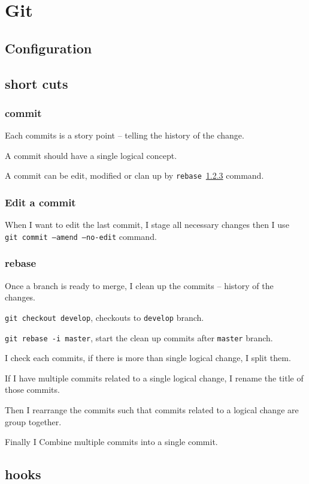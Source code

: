 \chapter{Git}

\section{Configuration}

\section{short cuts}

\subsection{commit}
Each commits is a story point -- telling the history of the change.

A commit should have a single logical concept.

A commit can be edit, modified or clan up by \texttt{rebase}~\ref{git_rebase} command.

\subsection{Edit a commit}
When I want to edit the last commit, I stage all necessary changes then I use \texttt{ git commit --amend --no-edit} command.


\subsection{rebase} \label{git_rebase}
Once a branch is ready to merge, I clean up the commits -- history of the changes. 


\texttt{git checkout develop}, checkouts to \texttt{develop} branch.

\texttt{git rebase -i master}, start the clean up commits after \texttt{master} branch.

I check each commits, if there is more than single logical change, I split them.

If I have multiple commits related to a single logical change, I rename the title of those commits.

Then I rearrange the commits such that commits related to a logical change are group together.

Finally I Combine multiple commits into a single commit.





\section{hooks}

